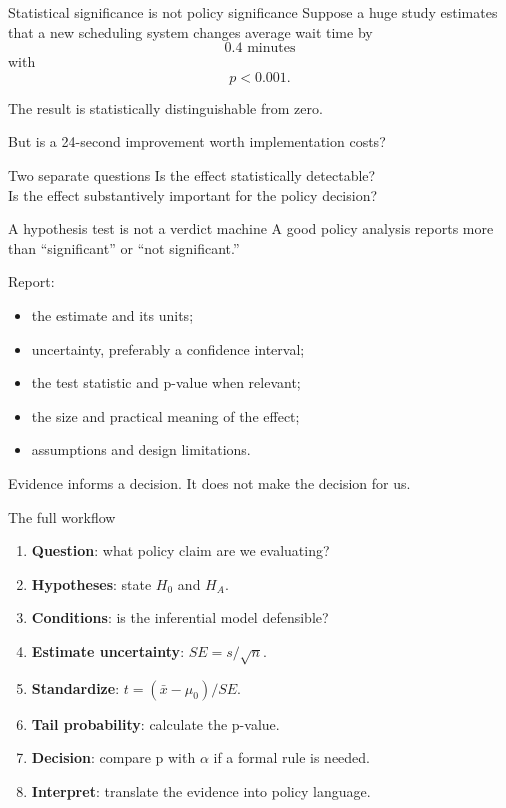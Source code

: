 \documentclass[11pt,aspectratio=169]{beamer}
\begin{document}
\begin{frame}{Statistical significance is not policy significance}
Suppose a huge study estimates that a new scheduling system changes average wait time by
\[
0.4\text{ minutes}
\]
with
\[
p<0.001.
\]

The result is statistically distinguishable from zero.

But is a 24-second improvement worth implementation costs?

\vfill
\begin{alertblock}{Two separate questions}
Is the effect statistically detectable?\\
Is the effect substantively important for the policy decision?
\end{alertblock}
\end{frame}

\begin{frame}{A hypothesis test is not a verdict machine}
A good policy analysis reports more than ``significant'' or ``not significant.''

Report:
\begin{itemize}
  \item the estimate and its units;
  \item uncertainty, preferably a confidence interval;
  \item the test statistic and p-value when relevant;
  \item the size and practical meaning of the effect;
  \item assumptions and design limitations.
\end{itemize}

\vfill
\alert{Evidence informs a decision. It does not make the decision for us.}
\end{frame}

\begin{frame}{The full workflow}
\begin{enumerate}
  \item \textbf{Question}: what policy claim are we evaluating?
  \item \textbf{Hypotheses}: state $H_0$ and $H_A$.
  \item \textbf{Conditions}: is the inferential model defensible?
  \item \textbf{Estimate uncertainty}: $SE=s/\sqrt{n}$.
  \item \textbf{Standardize}: $t=(\bar{x}-\mu_0)/SE$.
  \item \textbf{Tail probability}: calculate the p-value.
  \item \textbf{Decision}: compare p with $\alpha$ if a formal rule is needed.
  \item \textbf{Interpret}: translate the evidence into policy language.
\end{enumerate}
\end{frame}
\end{document}
